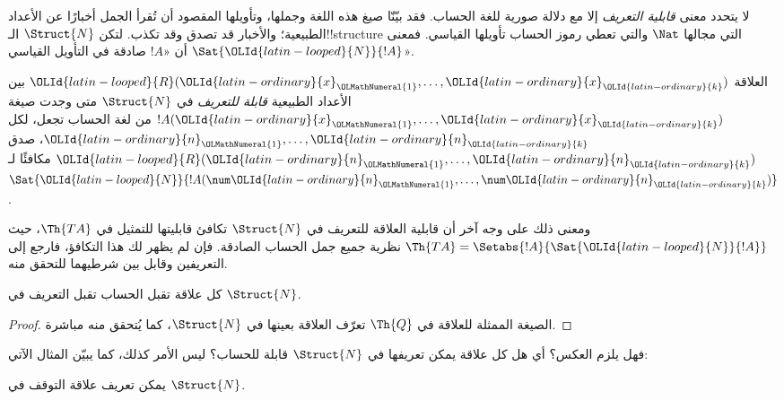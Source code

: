 \documentclass[../../../include/open-logic-section]{subfiles}
\begin{document}


لا يتحدد معنى \emph{قابلية التعريف} إلا مع دلالة صورية للغة
الحساب. فقد بيّنّا صيغ هذه اللغة وجملها، وتأويلها المقصود أن
تُقرأ الجمل أخبارًا عن الأعداد الطبيعية؛ والأخبار قد تصدق وقد
تكذب. لتكن $\Struct{N}$ الـ!!{structure} التي مجالها $\Nat$
والتي تعطي رموز الحساب تأويلها القياسي.
فمعنى $\Sat{\OLId{latin-looped}{N}}{!A}$ أن «$!A$ صادقة في التأويل القياسي».

\begin{defn}
العلاقة $\OLId{latin-looped}{R}(\OLId{latin-ordinary}{x}_\OLMathNumeral{1},\dots,\OLId{latin-ordinary}{x}_\OLId{latin-ordinary}{k})$ بين الأعداد الطبيعية
\emph{قابلة للتعريف} في $\Struct{N}$ متى وجدت صيغة
$!A(\OLId{latin-ordinary}{x}_\OLMathNumeral{1},\dots,\OLId{latin-ordinary}{x}_\OLId{latin-ordinary}{k})$ من لغة الحساب تجعل، لكل
$\OLId{latin-ordinary}{n}_\OLMathNumeral{1},\dots,\OLId{latin-ordinary}{n}_\OLId{latin-ordinary}{k}$، صدق $\OLId{latin-looped}{R}(\OLId{latin-ordinary}{n}_\OLMathNumeral{1},\dots,\OLId{latin-ordinary}{n}_\OLId{latin-ordinary}{k})$ مكافئًا لـ
$\Sat{\OLId{latin-looped}{N}}{!A(\num \OLId{latin-ordinary}{n}_\OLMathNumeral{1},\dots,\num \OLId{latin-ordinary}{n}_\OLId{latin-ordinary}{k})}$.
\end{defn}

ومعنى ذلك على وجه آخر أن قابلية العلاقة للتعريف في
$\Struct{N}$ تكافئ قابليتها للتمثيل في $\Th{TA}$،
حيث $\Th{TA} = \Setabs{!A}{\Sat{\OLId{latin-looped}{N}}{!A}}$ نظرية جميع جمل
الحساب الصادقة. فإن لم يظهر لك هذا التكافؤ، فارجع إلى التعريفين
وقابل بين شرطيهما للتحقق منه.

\begin{lem}
كل علاقة تقبل الحساب تقبل التعريف في $\Struct{N}$.
\end{lem}

\begin{proof}
الصيغة الممثلة للعلاقة في $\Th{Q}$ تعرّف العلاقة بعينها في
$\Struct{N}$، كما يُتحقق منه مباشرة.
\end{proof}

فهل يلزم العكس؟ أي هل كل علاقة يمكن تعريفها في $\Struct{N}$
قابلة للحساب؟ ليس الأمر كذلك، كما يبيّن المثال الآتي:

\begin{lem}
يمكن تعريف علاقة التوقف في $\Struct{N}$.
\end{lem}
\end{document}
